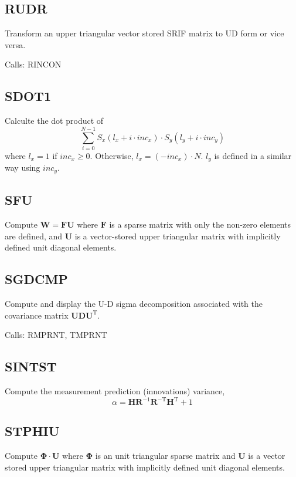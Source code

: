 \documentclass[./doc.tex]{subfiles}
\begin{document}
\subsection{RUDR}
Transform an upper triangular vector stored SRIF matrix to UD form or vice versa.

Calls: RINCON

\subsection{SDOT1}
Calculte the dot product of
\begin{equation}
    \sum_{i=0}^{N-1} S_x(l_x + i \cdot inc_x) \cdot S_y(l_y + i \cdot inc_y)
\end{equation}
where \(l_x=1\) if \(inc_x \ge 0\). Otherwise, \(l_x=(-inc_x) \cdot N\). \(l_y\) is defined in a similar way using \(inc_y\).

\subsection{SFU}
Compute \(\bm{W}=\bm{F} \bm{U}\) where \(\bm{F}\) is a sparse matrix with only the non-zero elements are defined,
and \(\bm{U}\) is a vector-stored upper triangular matrix with implicitly defined unit diagonal elements.

\subsection{SGDCMP}
Compute and display the U-D sigma decomposition associated with the covariance matrix
\(\bm{UD}\bm{U}^{\textrm{T}}\).

Calls: RMPRNT, TMPRNT

\subsection{SINTST}
Compute the measurement prediction (innovations) variance,
\begin{equation}
    \alpha = \bm{H}\bm{R}^{-1}\bm{R}^{-\textrm{T}}\bm{H}^{\textrm{T}} + 1
\end{equation}

\subsection{STPHIU}
Compute \(\bm{\Phi}\cdot \bm{U}\) where \(\bm{\Phi}\) is an unit triangular sparse matrix and \(\bm{U}\) is
a vector stored upper triangular matrix with implicitly defined unit diagonal elements.
\end{document}
